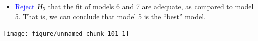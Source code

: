 \documentclass{article}\usepackage[]{graphicx}\usepackage[svgnames]{xcolor}
\newenvironment{knitrout}{}{} %
\newcommand{\HN}{\textsl{H}_{\textsl{0}}}%
\begin{document}
\begin{itemize}
      \item \textcolor{Blue}{Reject} $ \HN $ that the fit of models 6 and 7 are adequate, as compared to model 5. That is,
            we can conclude that model 5 is the ``best'' model.
\end{itemize}
\begin{knitrout}
\color{fgcolor}

{\centering \texttt{[image: figure/unnamed-chunk-101-1]} 

}


\end{knitrout}
\end{document}
